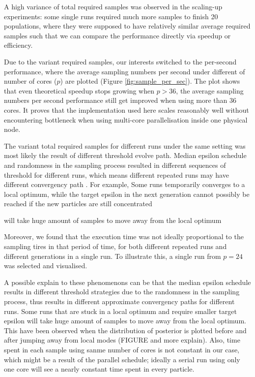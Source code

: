 A high variance of total required samples was observed in the scaling-up experiments: some single runs required much more samples to finish 20 populations, where they were supposed to have relatively similar average required samples such that we can compare the performance directly via speedup or efficiency.

Due to the variant required samples, our interests switched to the per-second performance, where the average sampling numbers per second under different of number of cores ($p$) are plotted (Figure \ref{fig:sample_per_sec}). The plot shows that even theoretical speedup stops growing when $p>36$, the average sampling numbers per second performance still get improved when using more than 36 cores. It proves that the implementation used here scales reasonably well without encountering bottleneck when using multi-core parallelisation inside one physical node.

The variant total required samples for different runs under the same setting was most likely the result of different threshold evolve path. Median epsilon schedule and randomness in the sampling process resulted in different sequences of threshold for different runs, which means different repeated runs may have different convergency path \cite{threshold}. For example, Some runs temporarily converges to a local optimum, while the target epsilon in the next generation cannot possibly be reached if the new particles are still concentrated 

will take huge amount of samples to move away from the local optimum

Moreover, we found that the execution time was not ideally proportional to the sampling tires in that period of time, for both different repeated runs and different generations in a single run. To illustrate this, a single run from $p=24$ was selected and visualised.


A possible explain to these phenomenons can be that the median epsilon schedule results in different threshold strategies due to the randomness in the sampling process, thus results in different approximate convergency paths for different runs. Some runs that are stuck in a local optimum and require smaller target epsilon will take huge amount of samples to move away from the local optimum. This have been observed when the distribution of posterior is plotted before and after jumping away from local modes (FIGURE and more explain). Also, time spent in each sample using sanme number of cores is not constant in our case, which might be a result of the parallel schedule; ideally a serial run using only one core will see a nearly constant time spent in every particle.



